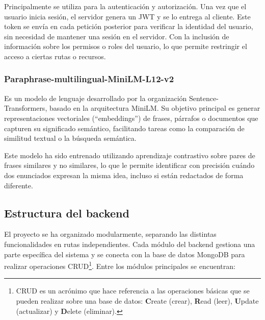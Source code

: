 Principalmente se utiliza para la autenticación y autorización. Una vez que el usuario inicia sesión, el servidor genera un JWT y se lo entrega al cliente. Este token se  envía en cada petición posterior para verificar la identidad del usuario, sin necesidad de mantener una sesión en el servidor. Con la inclusión de información sobre los permisos o roles del usuario, lo que permite restringir el acceso a ciertas rutas o recursos.

\subsubsection*{Paraphrase-multilingual-MiniLM-L12-v2\cite{minilm2022}}
Es un modelo de lenguaje desarrollado por la organización Sentence-Transformers, basado en la arquitectura MiniLM. Su objetivo principal es generar representaciones vectoriales (``embeddings'') de frases, párrafos o documentos que capturen su significado semántico, facilitando tareas como la comparación de similitud textual o la búsqueda semántica.

Este modelo ha sido entrenado utilizando aprendizaje contrastivo sobre pares de frases similares y no similares, lo que le permite identificar con precisión cuándo dos enunciados expresan la misma idea, incluso si están redactados de forma diferente.

\subsection{Estructura del backend}
El proyecto se ha organizado modularmente, separando las distintas funcionalidades en rutas independientes. Cada módulo del backend gestiona una parte específica del sistema y se conecta con la base de datos MongoDB para realizar operaciones CRUD\footnote{CRUD es un acrónimo que hace referencia a las operaciones básicas que se pueden realizar sobre una base de datos: \textbf{C}reate (crear), \textbf{R}ead (leer), \textbf{U}pdate (actualizar) y \textbf{D}elete (eliminar).}. Entre los módulos principales se encuentran:


